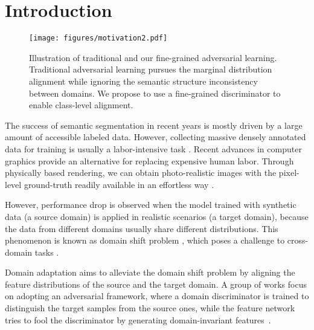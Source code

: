 \documentclass[runningheads]{llncs}
\begin{document}
\section{Introduction}

\begin{figure}[t]
\centering
   \texttt{[image: figures/motivation2.pdf]}
   \caption{Illustration of traditional and our fine-grained adversarial learning. Traditional adversarial learning pursues the marginal distribution alignment while ignoring the semantic structure inconsistency between domains. We propose to use a fine-grained discriminator to enable class-level alignment.
   }
\label{fig:motivation}
\end{figure}

The success of semantic segmentation \cite{Shelhamer2017FCN} in recent years is mostly driven by a large amount of accessible labeled data. However, collecting massive densely annotated data for training is usually a labor-intensive task \cite{Cordts2016Cityscapes}. 
 Recent advances in computer graphics provide an alternative for replacing expensive human labor. Through physically based rendering, we can obtain photo-realistic images with the pixel-level ground-truth readily available in an effortless way \cite{Richter_2016_ECCV_gtav,Ros_2016_CVPR_synthia}.



However, performance drop is observed when the model trained with synthetic data (a source domain) is applied in realistic scenarios (a target domain), because the data from different domains usually share different distributions. This phenomenon is known as domain shift problem \cite{covariate_shift}, which poses a challenge to cross-domain tasks \cite{hoffman2016fcns}.

Domain adaptation aims to alleviate the domain shift problem by aligning the feature distributions of the source and the target domain. 
A group of works focus on adopting an adversarial framework, where a domain discriminator is trained to distinguish the target samples from the source ones, while the feature network tries to fool the discriminator by generating domain-invariant features~\cite{hoffman2016fcns,Tsai_adaptseg_2018,Hoffman_cycada2017,zou2018cbst,Yawei2019Taking,saito2017maximum,Zhang_2017_ICCV_CDA, chen2018_dafrcnn, fcan}.
\end{document}
